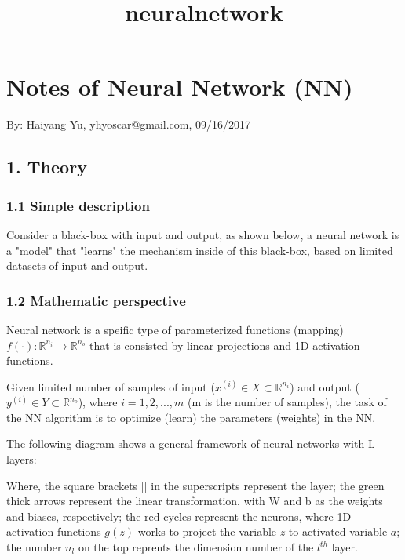 \documentclass[11pt]{article}
\title{neuralnetwork}
\begin{document}
    
    
    \maketitle
    
    

    
    \section{Notes of Neural Network (NN)}\label{notes-of-neural-network-nn}

By: Haiyang Yu, yhyoscar@gmail.com, 09/16/2017

\subsection{1. Theory}\label{theory}

\subsubsection{1.1 Simple description}\label{simple-description}

Consider a black-box with input and output, as shown below, a neural
network is a "model" that "learns" the mechanism inside of this
black-box, based on limited datasets of input and output.

\subsubsection{1.2 Mathematic perspective}\label{mathematic-perspective}

Neural network is a speific type of parameterized functions (mapping)
\(f(\cdot): \mathbb{R}^{n_i} \to \mathbb{R}^{n_o}\) that is consisted by
linear projections and 1D-activation functions.

Given limited number of samples of input
(\(x^{(i)} \in X \subset \mathbb{R}^{n_i}\)) and output
(\(y^{(i)} \in Y \subset \mathbb{R}^{n_o}\)), where \(i=1,2,...,m\) (m
is the number of samples), the task of the NN algorithm is to optimize
(learn) the parameters (weights) in the NN.

The following diagram shows a general framework of neural networks with
L layers:

Where, the square brackets {[}{]} in the superscripts represent the
layer; the green thick arrows represent the linear transformation, with
W and b as the weights and biases, respectively; the red cycles
represent the neurons, where 1D-activation functions \(g(z)\) works to
project the variable \(z\) to activated variable \(a\); the number
\(n_{l}\) on the top reprents the dimension number of the \(l^{th}\)
layer.
\end{document}
